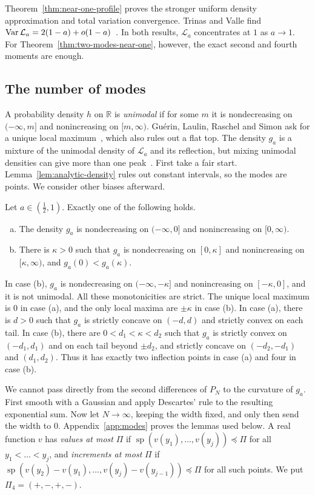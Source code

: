 Theorem~\ref{thm:near-one-profile} proves the stronger uniform density
approximation and total variation convergence. Trinas and Valle find
$\operatorname{Var}\mathcal L_a=2(1-a)+o(1-a)$~\cite[Eq.~(4.5)]{tv2026}. In both results, $\mathcal L_a$ concentrates at $1$ as $a\to1$.
For Theorem~\ref{thm:two-modes-near-one}, however, the exact second
and fourth moments are enough.

\subsection{The number of modes}\label{sec:modes}

A probability density $h$ on $\mathbb R$ is \emph{unimodal} if for some $m$
it is nondecreasing on $(-\infty,m]$ and nonincreasing on $[m,\infty)$.
Gu\'erin, Laulin, Raschel and Simon ask for a unique local maximum~\cite{glrs2025},
which also rules out a flat top. The density $g_a$ is a mixture of the unimodal density of
$\mathcal L_a$ and its reflection, but mixing unimodal densities can
give more than one peak~\cite{dj1988}. First take a fair start.
Lemma~\ref{lem:analytic-density} rules out constant intervals, so
the modes are points. We consider other biases afterward.

\begin{theorem}\label{thm:two-modes}
Let $a\in(\frac12,1)$. Exactly one of the following holds.
\begin{enumerate}[(a)]
\item The density $g_a$ is nondecreasing on $(-\infty,0]$ and nonincreasing on
$[0,\infty)$.
\item There is $\kappa>0$ such that $g_a$ is nondecreasing on $[0,\kappa]$ and
nonincreasing on $[\kappa,\infty)$, and $g_a(0)<g_a(\kappa)$.
\end{enumerate}
In case (b), $g_a$ is nondecreasing on $(-\infty,-\kappa]$ and nonincreasing on
$[-\kappa,0]$, and it is not unimodal. All these monotonicities are strict.
The unique local maximum is $0$ in case (a), and the only local maxima
are $\pm \kappa$ in case (b).
In case (a), there is $d>0$ such that $g_a$ is strictly concave on
$(-d,d)$ and strictly convex on each tail. In case (b), there are
$0<d_1<\kappa<d_2$ such that $g_a$ is strictly convex on $(-d_1,d_1)$ and
on each tail beyond $\pm d_2$, and strictly concave on
$(-d_2,-d_1)$ and $(d_1,d_2)$. Thus it has exactly two inflection points
in case (a) and four in case (b).
\end{theorem}

We cannot pass directly from the second differences of $P_N$ to
the curvature of $g_a$. First smooth with a Gaussian and apply
Descartes' rule to the resulting exponential sum. Now let
$N\to\infty$, keeping the width fixed, and only then send the width
to $0$. Appendix~\ref{app:modes} proves the lemmas used below. A real
function $v$ has \emph{values at most} $\Pi$ if
$\operatorname{sp}(v(y_1),\dots,v(y_j))\preceq\Pi$ for all $y_1<\dots<y_j$, and
\emph{increments at most} $\Pi$ if
$\operatorname{sp}(v(y_2)-v(y_1),\dots,v(y_j)-v(y_{j-1}))\preceq\Pi$ for all
such points. We put $\Pi_4=(+,-,+,-)$.

